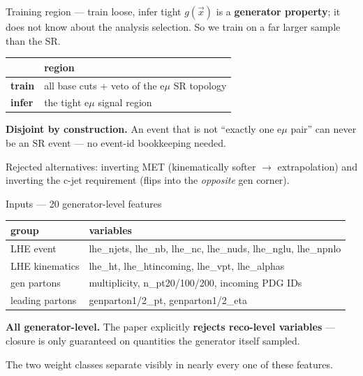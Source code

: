 \documentclass[aspectratio=169,10pt]{beamer}
\newcommand{\code}[1]{{\ttfamily\small\colorbox{codebg}{#1}}}
\begin{document}
\begin{frame}{Training region --- train loose, infer tight}
$g(\vec{x})$ is a \textbf{generator property}; it does not know about the analysis
selection. So we train on a far larger sample than the SR.
\vspace{0.4em}
\begin{center}
\begin{tabular}{ll}
\toprule
 & region \\
\midrule
\textbf{train} & all base cuts + veto of the e$\mu$ SR topology \\
\textbf{infer} & the tight e$\mu$ signal region \\
\bottomrule
\end{tabular}
\end{center}
\vspace{0.4em}
\begin{keybox}
\textbf{Disjoint by construction.} An event that is not ``exactly one e$\mu$ pair''
can never be an SR event --- no event-id bookkeeping needed.
\end{keybox}
{\small Rejected alternatives: inverting MET (kinematically softer $\rightarrow$
extrapolation) and inverting the c-jet requirement (flips into the \emph{opposite}
gen corner).}
\end{frame}

\begin{frame}{Inputs --- 20 generator-level features}
\vspace{0.3em}
\begin{center}
\small
\begin{tabular}{ll}
\toprule
group & variables \\
\midrule
LHE event & \code{lhe\_njets}, \code{lhe\_nb}, \code{lhe\_nc}, \code{lhe\_nuds}, \code{lhe\_nglu}, \code{lhe\_npnlo} \\
LHE kinematics & \code{lhe\_ht}, \code{lhe\_htincoming}, \code{lhe\_vpt}, \code{lhe\_alphas} \\
gen partons & multiplicity, \code{n\_pt20/100/200}, incoming PDG IDs \\
leading partons & \code{genparton1/2\_pt}, \code{genparton1/2\_eta} \\
\bottomrule
\end{tabular}
\end{center}
\vspace{0.4em}
\begin{keybox}
\textbf{All generator-level.} The paper explicitly \textbf{rejects reco-level
variables} --- closure is only guaranteed on quantities the generator itself sampled.
\end{keybox}
The two weight classes separate visibly in nearly every one of these features.
\end{frame}
\end{document}
